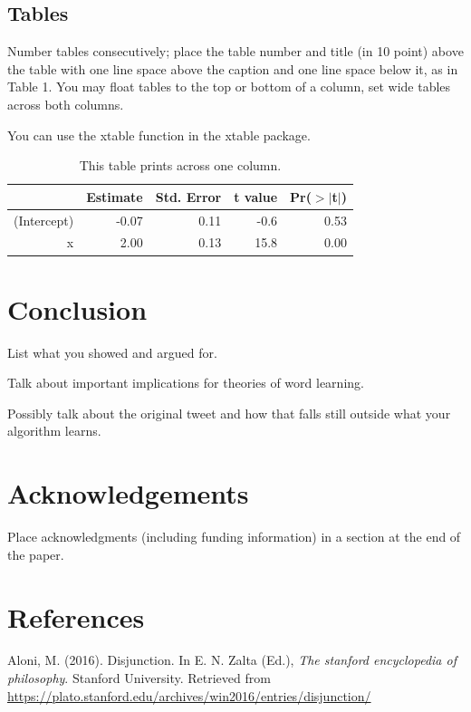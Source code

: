 \documentclass[10pt, letterpaper]{article}
\begin{document}
\subsection{Tables}\label{tables}

Number tables consecutively; place the table number and title (in 10
point) above the table with one line space above the caption and one
line space below it, as in Table 1. You may float tables to the top or
bottom of a column, set wide tables across both columns.

You can use the xtable function in the xtable package.

\begin{table}[H]
\centering
\begin{tabular}{rrrrr}
  \hline
 & Estimate & Std. Error & t value & Pr($>$$|$t$|$) \\ 
  \hline
(Intercept) & -0.07 & 0.11 & -0.6 & 0.53 \\ 
  x & 2.00 & 0.13 & 15.8 & 0.00 \\ 
   \hline
\end{tabular}
\caption{This table prints across one column.} 
\end{table}

\section{Conclusion}\label{conclusion}

List what you showed and argued for.

Talk about important implications for theories of word learning.

Possibly talk about the original tweet and how that falls still outside
what your algorithm learns.

\section{Acknowledgements}\label{acknowledgements}

Place acknowledgments (including funding information) in a section at
the end of the paper.

\section{References}\label{references}

\setlength{\parindent}{-0.1in} \setlength{\leftskip}{0.125in} \noindent

\hypertarget{refs}{}
\hypertarget{ref-Aloni2016}{}
Aloni, M. (2016). Disjunction. In E. N. Zalta (Ed.), \emph{The stanford
encyclopedia of philosophy}. Stanford University. Retrieved from
\url{https://plato.stanford.edu/archives/win2016/entries/disjunction/}
\end{document}
